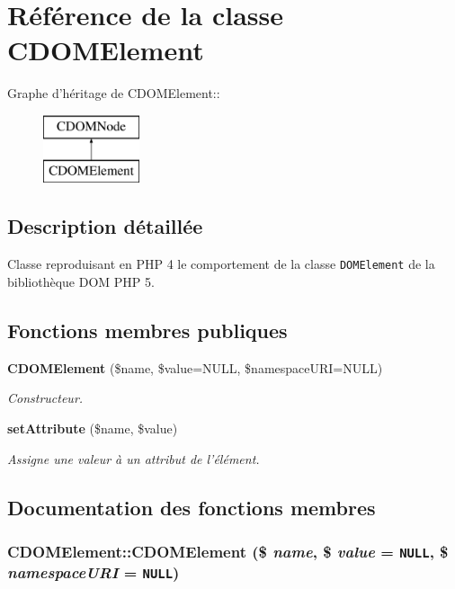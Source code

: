 \section{Référence de la classe CDOMElement}
\label{class_c_d_o_m_element}
Graphe d'héritage de CDOMElement::\begin{figure}[H]
\begin{center}
\leavevmode
\includegraphics[height=2cm]{class_c_d_o_m_element}
\end{center}
\end{figure}


\subsection{Description détaillée}
Classe reproduisant en PHP 4 le comportement de la classe {\tt DOMElement} de la bibliothèque DOM PHP 5. \subsection*{Fonctions membres publiques}
\begin{CompactItemize}
\item 
{\bf CDOMElement} (\$name, \$value=NULL, \$namespaceURI=NULL)
\begin{CompactList}\small\item\em Constructeur. \item\end{CompactList}\item 
{\bf setAttribute} (\$name, \$value)
\begin{CompactList}\small\item\em Assigne une valeur à un attribut de l'élément. \item\end{CompactList}\end{CompactItemize}


\subsection{Documentation des fonctions membres}
\subsubsection{\setlength{\rightskip}{0pt plus 5cm}CDOMElement::CDOMElement (\$ {\em name}, \/  \$ {\em value} = {\tt NULL}, \/  \$ {\em namespaceURI} = {\tt NULL})}\label{class_c_d_o_m_element_83adcf60034e908baeb6cd1a42826f31}


